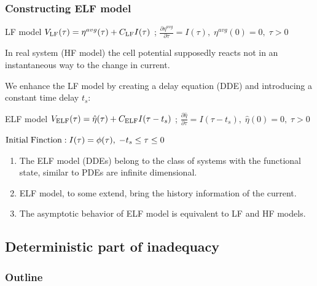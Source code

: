 \documentclass[10pt,xcolor=dvipsnames,compress]{beamer}
\begin{document}
\begin{frame}
\frametitle{Constructing ELF model}
\vfill


\begin{block}{LF model}
$
V_{\rm LF}(\tau) = {\eta}^{avg}(\tau) + C_{\rm LF} I(\tau)
$
; \quad
$
\frac{\partial{\eta}^{avg}}{\partial\tau} = I(\tau), \; {\eta}^{avg}(0)=0, \;  \tau>0 
$
\end{block}

In real system (HF model) the cell potential supposedly reacts not in an instantaneous way to the change in current.

We enhance the LF model by creating a delay equation (DDE) and introducing a constant time delay $t_s
$:



\begin{alertblock}{ELF model}
$
V_{\rm ELF}(\tau) = \hat{\eta}(\tau) + C_{\rm ELF} I(\tau - t_s)
$
; \quad
$
\frac{\partial{\hat{\eta}}}{\partial\tau} = I(\tau- t_s), \; {\hat{\eta}}(0)=0, \;  \tau>0
$
\begin{center}
$
{\rm Initial \; Finction:\;} I(\tau)=\phi(\tau), \;  -t_s \leq \tau \leq 0
$
\end{center}
\end{alertblock}


\begin{enumerate}
\item The ELF model (DDEs) belong to the class of systems with the functional state, similar to PDEs are infinite dimensional. 

\item ELF model, to some extend, bring the history information of the current.

\item The asymptotic behavior of ELF model is equivalent to LF and HF models.

\end{enumerate}


\vfill
\end{frame}


\subsection{Deterministic part of inadequacy}
\begin{frame}
\frametitle{Outline}
\vfill

\vspace{0.7in}
\vspace{0.7in}

\vfill
\end{frame}
\end{document}
